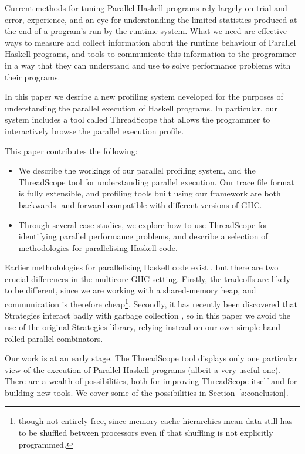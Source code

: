 \documentclass[twocolumn,9pt]{sigplanconf}
\let\cite=\citep
\begin{document}
Current methods for tuning Parallel Haskell programs rely largely on
trial and error, experience, and an eye for understanding the limited
statistics produced at the end of a program's run by the runtime
system.  What we need are effective ways to measure and collect
information about the runtime behaviour of Parallel Haskell programs,
and tools to communicate this information to the programmer in a
way that they can understand and use to solve performance problems
with their programs.

In this paper we desribe a new profiling system developed for the
purposes of understanding the parallel execution of Haskell programs.
In particular, our system includes a tool called ThreadScope that
allows the programmer to interactively browse the parallel execution
profile.

This paper contributes the following:

\begin{itemize}
\item We describe the workings of our parallel profiling system, and
  the ThreadScope tool for understanding parallel execution.  Our
  trace file format is fully extensible, and profiling tools built
  using our framework are both backwards- and forward-compatible with
  different versions of GHC.

\item Through several case studies, we explore how to use ThreadScope
  for identifying parallel performance problems, and describe a
  selection of methodologies for parallelising Haskell code.
\end{itemize}

Earlier methodologies for parallelising Haskell code exist
\cite{spj:trin98b}, but there are two crucial differences in the
multicore GHC setting.  Firstly, the tradeoffs are likely to be
different, since we are working with a shared-memory heap, and
communication is therefore cheap\footnote{though not entirely free,
  since memory cache hierarchies mean data still has to be shuffled
  between processors even if that shuffling is not explicitly
  programmed.}.  Secondly, it has recently been discovered that
Strategies interact badly with garbage collection
\cite{multicore-ghc}, so in this paper we avoid the use of the
original Strategies library, relying instead on our own simple
hand-rolled parallel combinators.

Our work is at an early stage.  The ThreadScope tool displays only one
particular view of the execution of Parallel Haskell programs (albeit
a very useful one).  There are a wealth of possibilities, both for
improving ThreadScope itself and for building new tools.  We cover
some of the possibilities in Section~\ref{s:conclusion}.
\end{document}
